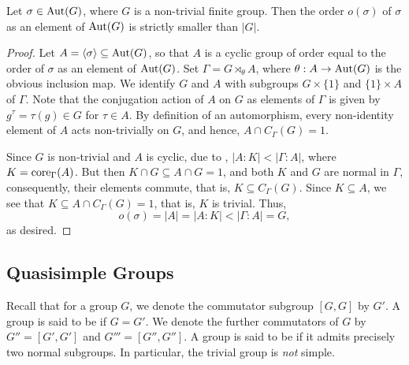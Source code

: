 \begin{theorem}[Horosevskii]
    Let $\sigma\in\operatorname{Aut}(G)$, where $G$ is a non-trivial finite group. Then the order $o(\sigma)$ of $\sigma$ as an element of $\operatorname{Aut}(G)$ is strictly smaller than $|G|$.
\end{theorem}
\begin{proof}
    Let $A = \langle\sigma\rangle\subseteq\operatorname{Aut}(G)$, so that $A$ is a cyclic group of order equal to the order of $\sigma$ as an element of $\operatorname{Aut}(G)$. Set $\Gamma = G\rtimes_\theta A$, where $\theta: A\to\operatorname{Aut}(G)$ is the obvious inclusion map. We identify $G$ and $A$ with subgroups $G\times\{1\}$ and $\{1\}\times A$ of $\Gamma$. Note that the conjugation action of $A$ on $G$ as elements of $\Gamma$ is given by $g^\tau = \tau(g)\in G$ for $\tau\in A$. By definition of an automorphism, every non-identity element of $A$ acts non-trivially on $G$, and hence, $A\cap C_\Gamma(G) = 1$.

    Since $G$ is non-trivial and $A$ is cyclic, due to , $|A : K| < |\Gamma : A|$, where $K = \operatorname{core}_\Gamma(A)$. But then $K\cap G\subseteq A\cap G = 1$, and both $K$ and $G$ are normal in $\Gamma$, consequently, their elements commute, that is, $K\subseteq C_\Gamma(G)$. Since $K\subseteq A$, we see that $K\subseteq A\cap C_\Gamma(G) = 1$, that is, $K$ is trivial. Thus,
    \begin{equation*}
        o(\sigma) = |A| = |A : K| < |\Gamma : A| = G,
    \end{equation*}
    as desired.
\end{proof}

\subsection{Quasisimple Groups}

Recall that for a group $G$, we denote the commutator subgroup $[G, G]$ by $G'$. A group is said to be  if $G = G'$. We denote the further commutators of $G$ by $G'' = [G', G']$ and $G''' = [G'', G'']$. A group is said to be  if it admits precisely two normal subgroups. In particular, the trivial group is \emph{not} simple.


